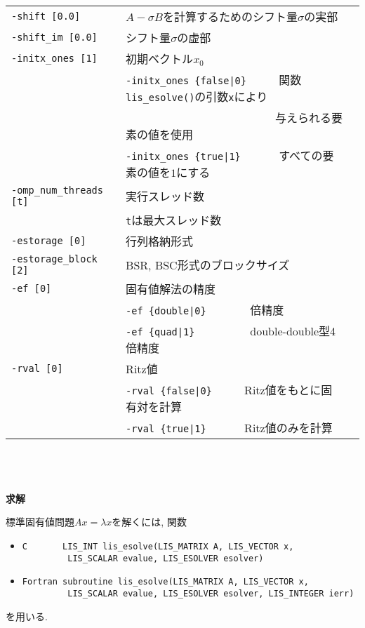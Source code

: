 \documentclass[a4paper]{jarticle}
\begin{document}
{{\begin{minipage}[t]{\textwidth}
\begin{center}
\begin{tabular}{l|ll}
\verb=-shift [0.0]= & $A-\sigma B$を計算するためのシフト量$\sigma$の実部 \\
\verb=-shift_im [0.0]= & シフト量$\sigma$の虚部 \\
\verb=-initx_ones [1]= & 初期ベクトル$x_{0}$  \\
                       & \verb=-initx_ones {false|0}     =  関数\verb=lis_esolve()=の引数\verb=x=により \\
                       & \verb=                          =  与えられる要素の値を使用 \\
                       & \verb=-initx_ones {true|1}      =  すべての要素の値を$1$にする\\
\verb=-omp_num_threads [t]= & 実行スレッド数         \\ 
                            & \verb=t=は最大スレッド数 \\
\verb=-estorage [0]=   & 行列格納形式 \\
\verb=-estorage_block [2]= & BSR, BSC形式のブロックサイズ \\ 
\verb=-ef [0]=         & 固有値解法の精度 \\
                       & \verb=-ef {double|0}       =   倍精度 \\
                       & \verb=-ef {quad|1}         =   double-double型4倍精度 \\
\verb=-rval [0]=       & Ritz値 \\
                       & \verb=-rval {false|0}     =  Ritz値をもとに固有対を計算 \\
                       & \verb=-rval {true|1}      =  Ritz値のみを計算 \\
\hline         
\end{tabular}
\end{center}
\end{minipage}
\\ \\ \\
\noindent
{\bf 求解}

標準固有値問題$Ax=\lambda x$を解くには, 関数
\begin{itemize}
\item \verb|C       LIS_INT lis_esolve(LIS_MATRIX A, LIS_VECTOR x,|\\
      \verb|         LIS_SCALAR evalue, LIS_ESOLVER esolver)|
\item \verb|Fortran subroutine lis_esolve(LIS_MATRIX A, LIS_VECTOR x,|\\
      \verb|         LIS_SCALAR evalue, LIS_ESOLVER esolver, LIS_INTEGER ierr)|
\end{itemize}
を用いる. 

}}
\end{document}
